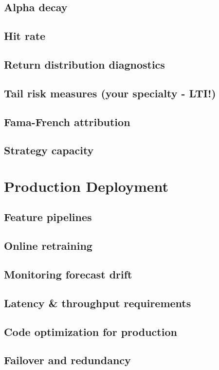 \documentclass{report}
\begin{document}
\subsection*{Alpha decay}
\subsection*{Hit rate}
\subsection*{Return distribution diagnostics}
\subsection*{Tail risk measures (your specialty - LTI!)}
\subsection*{Fama-French attribution}
\subsection*{Strategy capacity}


\section{Production Deployment}
\subsection*{Feature pipelines}
\subsection*{Online retraining}
\subsection*{Monitoring forecast drift}
\subsection*{Latency \& throughput requirements}
\subsection*{Code optimization for production}
\subsection*{Failover and redundancy}
\end{document}
